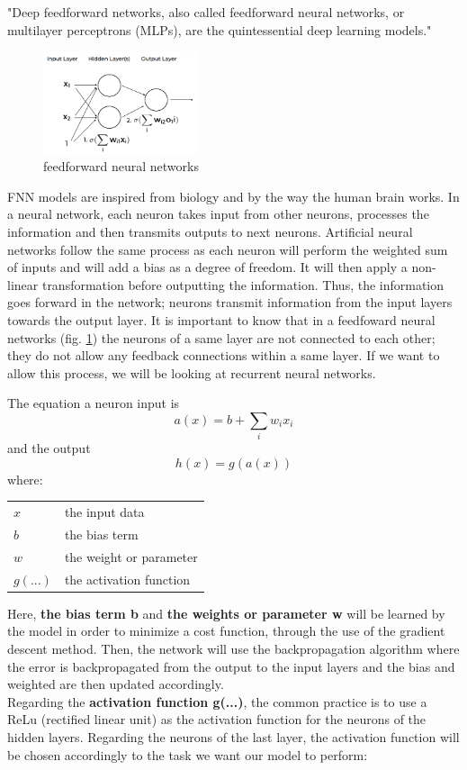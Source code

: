\documentclass[letter,8pt]{article}\usepackage[]{graphicx}\usepackage[]{color}
\makeatletter
\newenvironment{conditions}
  {\par\vspace{\abovedisplayskip}\noindent\begin{tabular}{>{$}l<{$} @{${}={}$} l}}
  {\end{tabular}\par\vspace{\belowdisplayskip}}
\makeatother
\begin{document}
"Deep feedforward networks, also called feedforward neural networks, or multilayer perceptrons (MLPs), are the quintessential deep learning models." \cite{Goodfellow-et-al-2016}
\begin{figure}
  \begin{center}
    \includegraphics[width=0.4\textwidth]{figure/feedforward_neural_networks.png}
  \end{center}
  \caption{feedforward neural networks}
  \label{fig:attention}
\end{figure}
FNN models are inspired from biology and by the way the human brain works. In a neural network, each neuron takes input from other neurons, processes the information and then transmits outputs to next neurons. Artificial neural networks follow the same process as each neuron will perform the weighted sum of inputs and will add a bias as a degree of freedom. It will then apply a non-linear transformation before outputting the information. Thus, the information goes forward in the network; neurons transmit information from the input layers towards the output layer. It is important to know that in a feedfoward neural networks (fig. \ref{fig:attention}) the neurons of a same layer are not connected to each other; they do not allow any feedback connections within a same layer. If we want to allow this process, we will be looking at recurrent neural networks.

The equation a neuron input is  
\begin{equation}
a(x) = b +\sum_{i}{w_i x_i}
\end{equation}
and the output
\begin{equation}
h(x) = g(a(x))
\end{equation}
where:
\begin{conditions}
 x     &  the input data \\
 b     &  the bias term \\
 w     &  the weight or parameter \\   
 g(...) &  the activation function
\end{conditions}


Here, \textbf{the bias term  b} and \textbf{the weights or parameter w} will be learned by the model in order to minimize a cost function, through the use of the gradient descent method. Then, the network will use the backpropagation algorithm where the error is backpropagated from the output to the input layers and the bias and weighted are then updated accordingly.\\
Regarding the \textbf{activation function g(...)}, the common practice is to use a ReLu (rectified linear unit) as the activation function for the neurons of the hidden layers. Regarding the neurons of the last layer, the activation function will be chosen accordingly to the task we want our model to perform:
\end{document}
